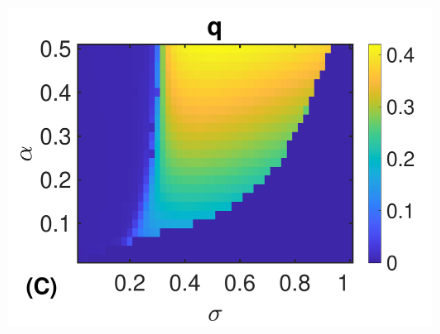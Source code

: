 \documentclass[%
 reprint,
superscriptaddress,
 amsmath,amssymb,
 prl,
]{revtex4-2}
\begin{document}
\begin{figure}[b]
\includegraphics[scale=0.22]{fig1c-eps-converted-to.pdf}


\end{figure}
\end{document}
